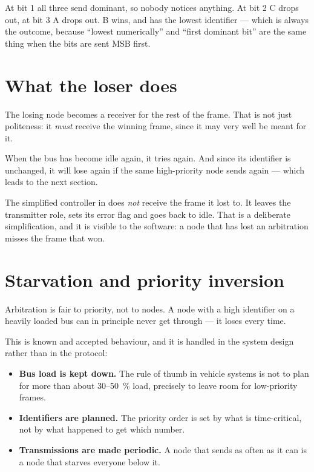 At bit 1 all three send dominant, so nobody notices anything. At bit 2 C drops out, at bit 3 A
drops out. B wins, and has the lowest identifier --- which is always the outcome, because ``lowest
numerically'' and ``first dominant bit'' are the same thing when the bits are sent MSB first.

\section{What the loser does}

The losing node becomes a receiver for the rest of the frame. That is not just politeness: it
\emph{must} receive the winning frame, since it may very well be meant for it.

When the bus has become idle again, it tries again. And since its identifier is unchanged, it will
lose again if the same high-priority node sends again --- which leads to the next section.

\begin{simplification}
\note[Simplification] The simplified controller in  does \emph{not} receive the
frame it lost to. It leaves the transmitter role, sets its error flag and goes back to idle. That
is a deliberate simplification, and it is visible to the software: a node that has lost an
arbitration misses the frame that won.
\end{simplification}

\section{Starvation and priority inversion}

Arbitration is fair to priority, not to nodes. A node with a high identifier on a heavily loaded
bus can in principle never get through --- it loses every time.

This is known and accepted behaviour, and it is handled in the system design rather than in the
protocol:

\begin{itemize}
  \item \textbf{Bus load is kept down.} The rule of thumb in vehicle systems is not to plan for
    more than about 30--50~\% load, precisely to leave room for low-priority frames.
  \item \textbf{Identifiers are planned.} The priority order is set by what is time-critical, not
    by what happened to get which number.
  \item \textbf{Transmissions are made periodic.} A node that sends as often as it can is a node
    that starves everyone below it.
\end{itemize}

